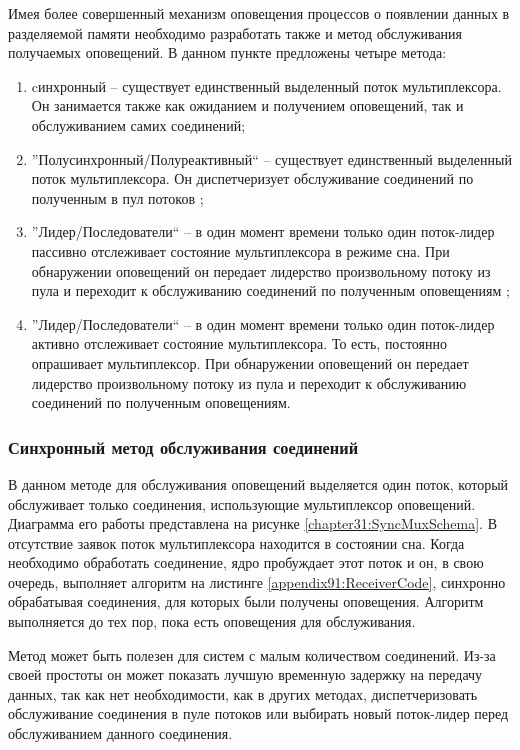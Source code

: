 Имея более совершенный механизм оповещения процессов о появлении данных в разделяемой памяти необходимо разработать также и метод обслуживания получаемых оповещений. В данном пункте предложены четыре метода:
\begin{enumerate}
\item cинхронный -- существует единственный выделенный поток мультиплексора. Он занимается также как ожиданием и получением оповещений, так и обслуживанием самих соединений;
\item ''Полусинхронный/Полуреактивный`` -- существует единственный выделенный поток мультиплексора. Он диспетчеризует обслуживание соединений по полученным в пул потоков \cite{schmidt1995half};
\item ''Лидер/Последователи`` -- в один момент времени только один поток-лидер пассивно отслеживает состояние мультиплексора в режиме сна. При обнаружении оповещений он передает лидерство произвольному потоку из пула и переходит к обслуживанию соединений по полученным оповещениям \cite{schmidt1998leader};
\item ''Лидер/Последователи`` -- в один момент времени только один поток-лидер активно отслеживает состояние мультиплексора. То есть, постоянно опрашивает мультиплексор. При обнаружении оповещений он передает лидерство произвольному потоку из пула и переходит к обслуживанию соединений по полученным оповещениям.
\end{enumerate}

\subsubsection{Синхронный метод обслуживания соединений}

В данном методе для обслуживания оповещений выделяется один поток, который обслуживает только соединения, использующие мультиплексор оповещений. Диаграмма его работы представлена на рисунке \ref{chapter31:SyncMuxSchema}.
В отсутствие заявок поток мультиплексора находится в состоянии сна. Когда необходимо обработать соединение, ядро пробуждает этот поток и он, в свою очередь, выполняет алгоритм на листинге \ref{appendix91:ReceiverCode}, синхронно обрабатывая соединения, для которых были получены оповещения. Алгоритм выполняется до тех пор, пока есть оповещения для обслуживания.

Метод может быть полезен для систем с малым количеством соединений. Из-за своей простоты он может показать лучшую временную задержку на передачу данных, так как нет необходимости, как в других методах, диспетчеризовать обслуживание соединения в пуле потоков или выбирать новый поток-лидер перед обслуживанием данного соединения.

